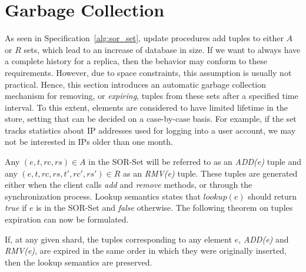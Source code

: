 \section{Garbage Collection}
\label{sec:garbage_collection}

As seen in Specification~\ref{alg:sor_set}, update procedures add tuples to
either $A$ or $R$ sets, which lead to an increase of database in size. If we
want to always have a complete history for a replica, then the behavior may
conform to these requirements. However, due to space constraints, this
assumption is usually not practical. Hence, this section introduces an automatic
garbage collection mechanism for removing, or \textit{expiring}, tuples from
these sets after a specified time interval. To this extent, elements are
considered to have limited lifetime in the store, setting that can be decided on
a case-by-case basis. For example, if the set tracks statistics about IP
addresses used for logging into a user account, we may not be interested in IPs
older than one month.

Any $(e, t, rc, rs) \in A$ in the SOR-Set will be referred to as an
\textit{ADD(e)} tuple and any $(e, t, rc, rs, t', rc', rs') \in R$ as an
\textit{RMV(e)} tuple. These tuples are generated either when the client calls
\textit{add} and \textit{remove} methods, or through the synchronization
process. Lookup semantics states that $\textit{lookup}(e)$ should return
\textit{true} if $e$ is in the SOR-Set and \textit{false} otherwise. The
following theorem on tuples expiration can now be formulated.

\begin{theorem}
\begin{itshape}
If, at any given shard, the tuples corresponding to any element $e$,
\textit{ADD(e)} and \textit{RMV(e)}, are expired in the same order in which they
were originally inserted, then the lookup semantics are preserved.
\end{itshape}
\end{theorem}

